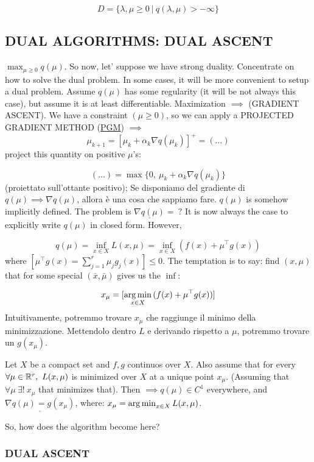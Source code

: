 \[
	D = \{\lambda,\mu\geq 0\ |\ q(\lambda,\mu)>-\infty\}
\]

\subsection{DUAL ALGORITHMS: DUAL ASCENT}

$\max_{\mu\geq 0}{q(\mu)}$. So now, let' suppose we have strong duality. Concentrate on how to solve the dual problem. In some cases, it will be more convenient to setup a dual problem. Assume $q(\mu)$ has some regularity (it will be not always this case), but assume it is at least differentiable. Maximization $\implies$ (GRADIENT ASCENT). We have a constraint $(\mu\geq 0)$, so we can apply a PROJECTED GRADIENT METHOD (\underline{PGM}) $\implies$
\[
	\mu_{k+1} = [\mu_k +\alpha_k\nabla{q(\mu_k)}]^+ = (\dots)
\]
project this quantity on positive $\mu$'s:

\[
	(\dots) = \max{\{0,\ \mu_k+\alpha_k\nabla{q(\mu_k)}\}}
\]
(proiettato sull'ottante positivo); Se disponiamo del gradiente di $q(\mu) \implies \nabla{q(\mu)}$, allora è una cosa che sappiamo fare. $q(\mu)$ is somehow implicitly defined. The problem is $\underline{\nabla{q(\mu)}} =\ ?$ It is now always the case to explicitly write $q(\mu)$ in closed form. However,

\[
	q(\mu) = \inf_{x\in X}{L(x,\mu)} = \inf_{x\in X}{(f(x) + \mu^\top g(x))}
\]
where $[\mu^\top g(x) = \sum_{j=1}^r{\mu_jg_j(x)}] \leq 0$. The temptation is to say: find $(x,\mu)$ that for some special $(\bar{x},\bar{\mu})$ gives us the $\inf$:

\[
	x_\mu = [\operatorname*{arg\,min}_{x\in X}{(f(x) + \mu^\top g(x))}]
\]
Intuitivamente, potremmo trovare $x_\mu$ che raggiunge il minimo della minimizzazione. Mettendolo dentro $L$ e derivando rispetto a $\mu$, potremmo trovare un $g(x_\mu)$.

\begin{prop}

Let $X$ be a compact set and $f,g$ continuos over $X$. Also assume that for every $\forall\mu\in\mathbb{R}^r,\ L(x,\mu)$ is minimized over $X$ at a unique point $x_\mu$. (Assuming that $\forall\mu\ \exists!\ x_\mu$ that minimizes that). Then $\implies q(\mu)\in C^1$ everywhere, and $\underline{\nabla{q(\mu)} = g(x_\mu)}$, where: $x_\mu=\operatorname*{arg\,min}_{x\in X}{L(x,\mu)}$.
\end{prop}

So, how does the algorithm become here?

\subsubsection{DUAL ASCENT}


